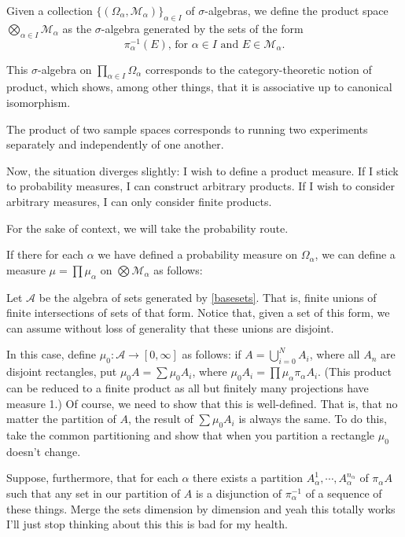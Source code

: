 \documentclass{article}
\theoremstyle{definition}
\newcommand{\M}{\mathcal{M}}
\newcommand{\A}{\mathcal{A}}
\begin{document}
	Given a collection $\{(\Omega_\alpha, \M_\alpha)\}_{\alpha \in I}$ of $\sigma$-algebras, we define the product space $\bigotimes_{\alpha\in I} \M_\alpha$ as the $\sigma$-algebra generated by the sets of the form
	\begin{equation}\label{basesets}
	\pi_\alpha^{-1}(E)\text{, for $\alpha \in I$ and $E \in \M_\alpha$}.
	\end{equation}
	
	This $\sigma$-algebra on $\prod_{\alpha \in I} \Omega_\alpha$ corresponds to the category-theoretic notion of product, which shows, among other things, that it is associative up to canonical isomorphism.
	
	The product of two sample spaces corresponds to running two experiments separately and independently of one another.
	
	Now, the situation diverges slightly: I wish to define a product measure. If I stick to probability measures, I can construct arbitrary products. If I wish to consider arbitrary measures, I can only consider finite products.
	
	For the sake of context, we will take the probability route.
	
	If there for each $\alpha$ we have defined a probability measure on $\Omega_\alpha$, we can define a measure $\mu = \prod \mu_\alpha$ on $\bigotimes \M_\alpha$ as follows:
	
	Let $\A$ be the algebra of sets generated by \eqref{basesets}. That is, finite unions of finite intersections of sets of that form. Notice that, given a set of this form, we can assume without loss of generality that these unions are disjoint.
	
	In this case, define $\mu_0 : \A \to \left[0, \infty\right]$ as follows: if $A = \bigcup_{i = 0}^N A_i$, where all $A_n$ are disjoint rectangles, put $\mu_0 A = \sum \mu_0 A_i$, where $\mu_0 A_i = \prod \mu_\alpha \pi_\alpha A_i$. (This product can be reduced to a finite product as all but finitely many projections have measure 1.) Of course, we need to show that this is well-defined. That is, that no matter the partition of $A$, the result of $\sum \mu_0 A_i$ is always the same. To do this, take the common partitioning and show that when you partition a rectangle $\mu_0$ doesn't change.
	
	Suppose, furthermore, that for each $\alpha$ there exists a partition $A_\alpha^1, \cdots, A_\alpha^{n_\alpha}$ of $\pi_\alpha A$ such that any set in our partition of $A$ is a disjunction of $\pi_\alpha^{-1}$ of a sequence of these things. Merge the sets dimension by dimension and yeah this totally works I'll just stop thinking about this this is bad for my health.
	
\end{document}
